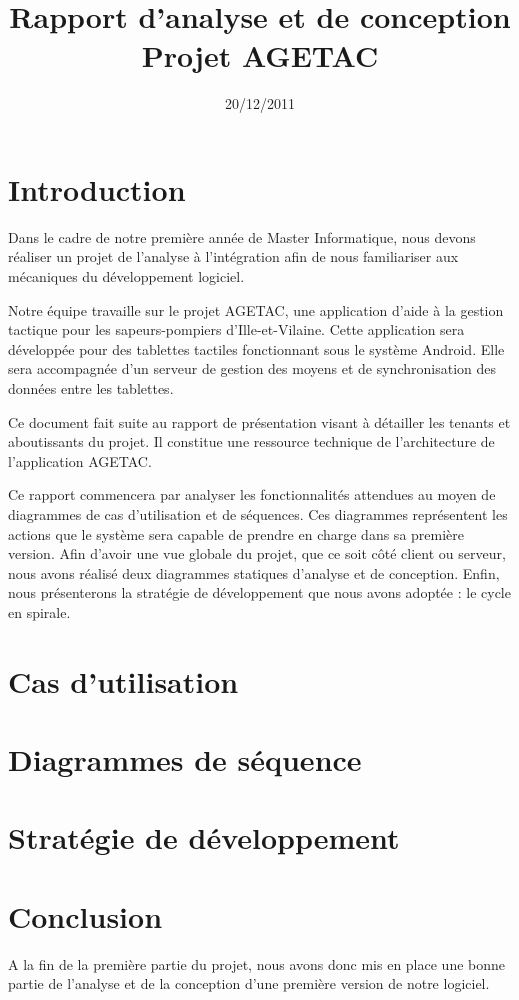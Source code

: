 \documentclass{article}
\title{Rapport d'analyse et de conception\\Projet AGETAC}
\date{20/12/2011}
\begin{document}
\maketitle

\tableofcontents 


\section*{Introduction}

Dans le cadre de notre première année de Master Informatique, nous devons réaliser un projet de l’analyse à l’intégration afin de nous familiariser aux mécaniques du développement logiciel.

Notre équipe travaille sur le projet AGETAC, une application d’aide à la gestion tactique pour les sapeurs-pompiers d’Ille-et-Vilaine. Cette application sera développée pour des tablettes tactiles fonctionnant sous le système Android. Elle sera accompagnée d’un serveur de gestion des moyens et de synchronisation des données entre les tablettes.

Ce document fait suite au rapport de présentation visant à détailler les tenants et aboutissants du projet. Il constitue une ressource technique de l’architecture de l’application AGETAC.

Ce rapport commencera par analyser les fonctionnalités attendues au moyen de diagrammes de cas d’utilisation et de séquences. Ces diagrammes représentent les actions que le système sera capable de prendre en charge dans sa première version. Afin d’avoir une vue globale du projet, que ce soit côté client ou serveur, nous avons réalisé deux diagrammes statiques d’analyse et de conception. Enfin, nous présenterons la stratégie de développement que nous avons adoptée : le cycle en spirale.


\section{Cas d'utilisation}

\section{Diagrammes de séquence}

\section{Stratégie de développement}

\section*{Conclusion}
A la fin de la première partie du projet, nous avons donc mis en place une bonne partie de l’analyse et de la conception d’une première version de notre logiciel.
\end{document}
